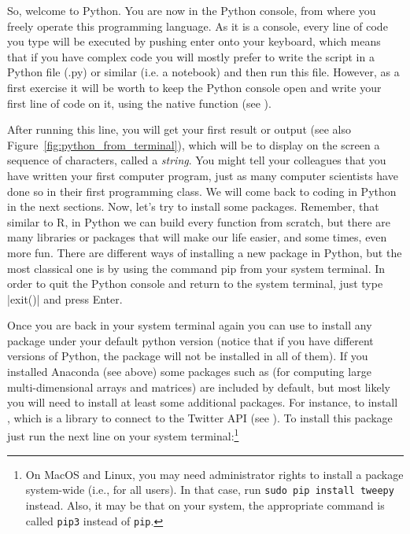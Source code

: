 So, welcome to Python. You are now in the Python console, from where
you freely operate this programming language. As it is a console,
every line of code you type will be executed by pushing enter onto
your keyboard, which means that if you have complex code you will
mostly prefer to write the script in a Python file (.py) or similar
(i.e. a notebook) and then run this file. However, as a first exercise
it will be worth to keep the Python console open and write your first
line of code on it, using the native function  (see ).


After running this line, you will get your first result or
output (see also Figure~\ref{fig:python_from_terminal}), which will be to
display on the screen a sequence of characters, called a
\emph{string}. You might tell your colleagues that you have written
your first computer program, just as many computer scientists have
done so in their first programming class. We will come back to coding
in Python in the next sections. Now, let’s try to install some
packages. Remember, that similar to R, in Python we can build every
function from scratch, but there are many libraries or packages that
will make our life easier, and some times, even more fun. There are
different ways of installing a new package in Python, but the most
classical one is by using the command pip from your system
terminal. In order to quit the Python console and return to the system
terminal, just type |exit()| and press Enter.

Once you are back in your system terminal again you can use  to
install any package under your default python version (notice that if
you have different versions of Python, the package
will not be installed in all of them).  If you installed Anaconda
(see above) some packages such as  (for computing large
multi-dimensional arrays and matrices) are included by default,
but most likely you will need to install at least some additional
packages. For instance, to install , which is a library
to connect to the Twitter API (see ). To
install this package just run the next line on your system terminal:\footnote{On MacOS and Linux, you may need administrator rights to install a package system-wide (i.e., for all users). In that case, run \texttt{sudo pip install tweepy}
instead. Also, it may be that on your system, the appropriate command is called \texttt{pip3} instead of \texttt{pip}.}

